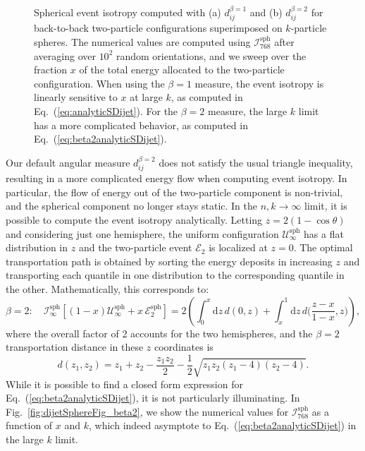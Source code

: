 \documentclass[letterpaper,11pt]{article}
\newcommand{\iso}[2]{\mathcal{I}^\text{#1}_{#2}}
\DeclareRobustCommand{\Fig}[1]{Fig.~\ref{#1}}
\DeclareRobustCommand{\Eq}[1]{Eq.~(\ref{#1})}
\begin{document}
\begin{figure}[t]
\centering
{}
\hfill
{}
\caption{Spherical event isotropy computed with (a) $d_{ij}^{\beta=1}$ and (b) $d_{ij}^{\beta=2}$ for back-to-back two-particle configurations superimposed on $k$-particle spheres. 
%
The numerical values are computed using $\iso{sph}{768}$ after averaging over $10^2$ random orientations, and we sweep over the fraction $x$ of the total energy allocated to the two-particle configuration. 
%
When using the $\beta = 1$ measure, the event isotropy is linearly sensitive to $x$ at large $k$, as computed in \Eq{eq:analyticSDijet}. 
%
For the $\beta =2$ measure, the large $k$ limit has a more complicated behavior, as computed in \Eq{eq:beta2analyticSDijet}.}
\label{fig:dijetSphereFig}
\end{figure}



Our default angular measure $d_{ij}^{\beta=2}$ does not satisfy the usual triangle inequality, resulting in a more complicated energy flow when computing event isotropy.
%
In particular, the flow of energy out of the two-particle component is non-trivial, and the spherical component no longer stays static.
%
In the $n,k \to \infty$ limit, it is possible to compute the event isotropy analytically.
%
Letting $z = 2(1-\cos \theta)$ and considering just one hemisphere, the uniform configuration $\mathcal{U}^\text{sph}_\infty$ has a flat distribution in $z$ and the two-particle event $\mathcal{E}_2$ is localized at $z = 0$.
%
The optimal transportation path is obtained by sorting the energy deposits in increasing $z$ and transporting each quantile in one distribution to the corresponding quantile in the other.
%
Mathematically, this corresponds to:
%
\begin{equation}
\label{eq:beta2analyticSDijet}
\beta =2: \quad \iso{sph}{\infty}\left[ (1-x)\mathcal{U}^\text{sph}_{\infty} + x \, \mathcal{E}^\text{sph}_2 \right] = 2 \left(\int_{0}^x \text{d}z \, d(0,z) + \int_{x}^{1} \text{d}z \,d\Big(\frac{z-x}{1-x}, z \Big) \right),
\end{equation}
%
where the overall factor of 2 accounts for the two hemispheres, and the $\beta = 2$ transportation distance in these $z$ coordinates is
%
\begin{equation}
d(z_1, z_2) = z_1 + z_2 - \frac{z_1 z_2}{2} - \frac{1}{2} \sqrt{z_1 z_2 (z_1 - 4)(z_2 - 4)}.
\end{equation}
%
While it is possible to find a closed form expression for \Eq{eq:beta2analyticSDijet}, it is not particularly illuminating.
%
In \Fig{fig:dijetSphereFig_beta2}, we show the numerical values for $\iso{sph}{768}$ as a function of $x$ and $k$, which indeed asymptote to \Eq{eq:beta2analyticSDijet} in the large $k$ limit.
\end{document}
